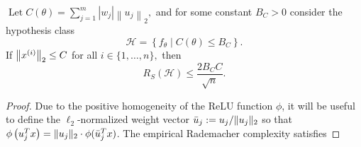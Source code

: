 \begin{theorem}\label{lec8:thm:thm-improved-nn-rc}
$\operatorname{Let} C(\theta)=\sum_{j=1}^{m}\left|w_{j}\right|\left\|u_{j}\right\|_{2},$ and for some constant $B_{C}>0$ consider the hypothesis class
\begin{equation}
\mathcal{H}=\left\{f_{\theta} \mid C(\theta) \leq B_{C}\right\}.
\end{equation}
If $\left\|x\sp{i}\right\|_{2} \leq C$ for all $i \in\{1, \ldots, n\},$ then
\begin{equation}
R_{S}(\mathcal{H}) \leq \frac{2 B_{C} C}{\sqrt{n}}.
\end{equation}
\end{theorem}

\begin{proof}
Due to the positive homogeneity of the ReLU function $\phi$, it will be useful to define the $\ell_2$-normalized weight vector $\bar{u}_j := u_j / \norm{u_j}_2$ so that $\phi\left(u_j^T x\right) = \norm{u_j}_2 \cdot \phi(\bar{u}_j^T x)$. The empirical Rademacher complexity satisfies
\allowdisplaybreaks
{}
\end{proof}
